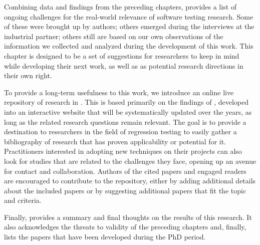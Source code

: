 Combining data and findings from the preceding chapters,  provides a list of ongoing challenges for the real-world relevance of software testing research.
Some of these were brought up by authors; others emerged during the interviews at the industrial partner; others still are based on our own observations of the information we collected and analyzed during the development of this work.
This chapter is designed to be a set of suggestions for researchers to keep in mind while developing their next work, as well as as potential research directions in their own right.

To provide a long-term usefulness to this work, we introduce an online live repository of research in .
This is based primarily on the findings of , developed into an interactive website that will be systematically updated over the years, as long as the related research questions remain relevant.
The goal is to provide a destination to researchers in the field of regression testing to easily gather a bibliography of research that has proven applicability or potential for it.
Practitioners interested in adopting new techniques on their projects can also look for studies that are related to the challenges they face, opening up an avenue for contact and collaboration.
Authors of the cited papers and engaged readers are encouraged to contribute to the repository, either by adding additional details about the included papers or by suggesting additional papers that fit the topic and criteria.

Finally,  provides a summary and final thoughts on the results of this research.
It also acknowledges the threats to validity of the preceding chapters and, finally, lists the papers that have been developed during the PhD period.

